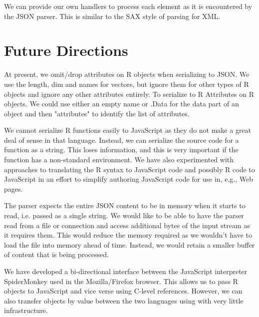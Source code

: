 \documentclass[article]{jss}
\begin{document}
We can provide our own handlers to process each element
as it is encountered by the JSON parser.
This is similar to the SAX style of parsing for XML.

\section{Future Directions}

At present, we omit/drop attributes on R objects when serializing to
JSON.  We use the length, dim and names for vectors, but ignore them
for other types of R objects and ignore any other attributes entirely.
To serialize to R Attributes on R objects.  We could use either an
empty name or .Data for the data part of an object and then
"attributes" to identify the list of attributes.

We cannot serialize R functions easily to JavaScript
as they do not make a great deal of sense in that language. Instead,
we can serialize the source code for a function as a string.
This loses information, and this is very important if the
function has a non-standard environment.
We have also experimented with approaches to translating the  R syntax
to JavaScript code and possibly R code to JavaScript
in an effort to simplify authoring JavaScript code for use in, e.g.,
Web  pages. 

The  parser expects the entire 
JSON content to be in memory when it starts to read,
i.e. passed as a single string. We would like to be able
to have the parser read from a file or connection
and access additional bytes of the input stream as it requires them.
This would reduce the memory required as we wouldn't have to 
load the file into memory ahead  of time.  Instead, we would retain
a smaller buffer of content that is being processed.

We have developed a bi-directional interface between the JavaScript
interpreter SpiderMonkey used in the Mozilla/Firefox browser.  This
allows us to pass R objects to JavaScript and vice verse using C-level
references. However, we can also transfer objects by value between the
two languages using  with very little
infrastructure.

\clearpage

 
\end{document}
